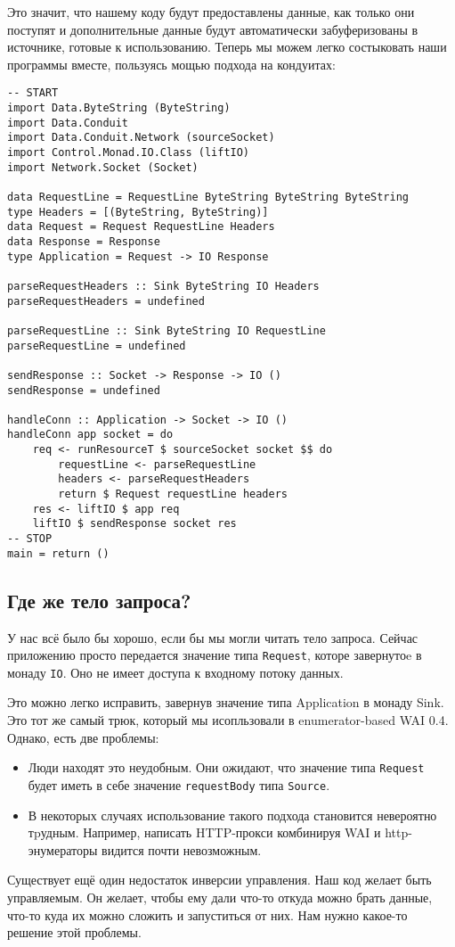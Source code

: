 Это значит, что нашему коду будут предоставлены данные, как только они поступят 
и дополнительные данные будут автоматически забуферизованы в источнике, 
готовые к использованию. Теперь мы можем легко состыковать наши программы 
вместе, пользуясь мощью подхода на кондуитах:
\begin{lstlisting}
-- START
import Data.ByteString (ByteString)
import Data.Conduit
import Data.Conduit.Network (sourceSocket)
import Control.Monad.IO.Class (liftIO)
import Network.Socket (Socket)

data RequestLine = RequestLine ByteString ByteString ByteString
type Headers = [(ByteString, ByteString)]
data Request = Request RequestLine Headers
data Response = Response
type Application = Request -> IO Response

parseRequestHeaders :: Sink ByteString IO Headers
parseRequestHeaders = undefined

parseRequestLine :: Sink ByteString IO RequestLine
parseRequestLine = undefined

sendResponse :: Socket -> Response -> IO ()
sendResponse = undefined

handleConn :: Application -> Socket -> IO ()
handleConn app socket = do
    req <- runResourceT $ sourceSocket socket $$ do
        requestLine <- parseRequestLine
        headers <- parseRequestHeaders
        return $ Request requestLine headers
    res <- liftIO $ app req
    liftIO $ sendResponse socket res
-- STOP
main = return ()
\end{lstlisting}
\subsection{Где же тело запроса?}
У нас всё было бы хорошо, если бы мы могли читать тело запроса. Сейчас
приложению просто передается значение типа \lstinline'Request', которе 
завернутоe в монаду \lstinline'IO'. 
Оно не имеет доступа к входному потоку данных.

Это можно легко исправить, завернув значение типа Application в монаду Sink. 
Это тот же самый трюк, который мы исопльзовали в enumerator-based WAI 0.4. 
Однако, есть две проблемы:

\begin{itemize}
\item Люди находят это неудобным. Они ожидают, что значение типа 
\lstinline'Request' будет иметь в себе значение \lstinline'requestBody' типа 
\lstinline'Source'.
\item В некоторых случаях использование такого подхода становится невероятно 
тpудным. Например, написать HTTP-прокси комбинируя WAI и http-энумераторы 
видится почти невозможным.
\end{itemize}
Существует ещё один недостаток инверсии управления. Наш код желает быть 
управляемым. Он желает, чтобы ему дали что-то откуда можно брать данные, что-то 
куда их можно сложить и запуститься от них. Нам нужно какое-то решение этой проблемы.

